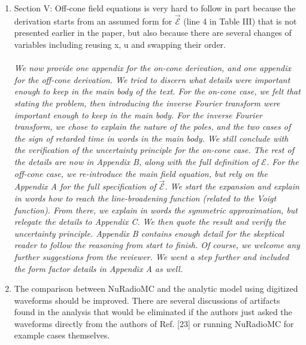 \documentclass[12pt]{article}
\begin{document}
\begin{enumerate}
\item Section V: Off-cone field equations is very hard to follow in part
because the derivation starts from an assumed form for
$\mathcal{\vec{E}}$ (line 4 in Table III) that is not presented earlier
in the paper, but also because there are several changes of variables
including reusing x, u and swapping their order. \\ \\
\textit{We now provide one appendix for the on-cone derivation, and one appendix for the off-cone derivation.  We tried to discern what details were important enough to keep in the main body of the text.  For the on-cone case, we felt that stating the problem, then introducing the inverse Fourier transform were important enough to keep in the main body.  For the inverse Fourier transform, we chose to explain the nature of the poles, and the two cases of the sign of retarded time in words in the main body.  We still conclude with the verification of the uncertainty principle for the on-cone case.  The rest of the details are now in Appendix B, along with the full definition of $\mathcal{E}$.  For the off-cone case, we re-introduce the main field equation, but rely on the Appendix A for the full specification of $\vec{\mathcal{E}}$.  We start the expansion and explain in words how to reach the line-broadening function (related to the Voigt function).  From there, we explain in words the \textit{symmetric approximation}, but relegate the details to Appendix C.  We then quote the result and verify the uncertainty principle.  Appendix B contains enough detail for the skeptical reader to follow the reasoning from start to finish.  Of course, we welcome any further suggestions from the reviewer.  We went a step further and included the form factor details in Appendix A as well.}
\item The comparison between NuRadioMC and the analytic model using digitized waveforms should be improved. There are several discussions of artifacts found in the analysis that would be eliminated if the authors just asked the waveforms directly from the authors of Ref. [23] or running NuRadioMC for example cases themselves. \\ \\

\end{enumerate}
\end{document}
